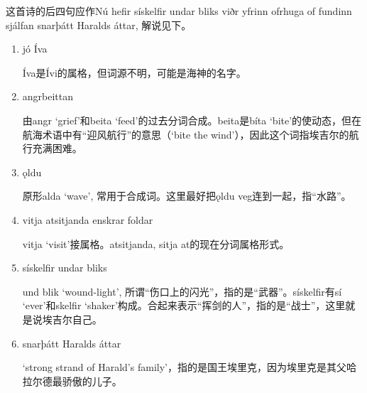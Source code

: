 \begin{grammar*}{}
  这首诗的后四句应作Nú hefir sískelfir undar bliks viðr yfrinn ofrhuga of fundinn sjálfan
  snarþátt Haralds áttar, 解说见下。
  \begin{enumerate}[leftmargin=*]
    \item jó Íva

          Íva是Ívi的属格，但词源不明，可能是海神的名字。

    \item angrbeittan

          由angr `grief'和beita `feed'的过去分词合成。beita是bíta `bite'的使动态，但在航海术语中有“迎风航行”的意思（`bite the wind'），因此这个词指埃吉尔的航行充满困难。

    \item ǫldu

          原形alda `wave', 常用于合成词。这里最好把ǫldu veg连到一起，指“水路”。
    \item vitja atsitjanda enskrar foldar

          vitja `visit'接属格。atsitjanda, sitja at的现在分词属格形式。
    \item sískelfir undar bliks

          und blik `wound-light', 所谓“伤口上的闪光”，指的是“武器”。sískelfir有sí `ever'和skelfir `shaker'构成。合起来表示“挥剑的人”，指的是“战士”，这里就是说埃吉尔自己。

    \item snarþátt Haralds áttar

          `strong strand of Harald's family'，指的是国王埃里克，因为埃里克是其父哈拉尔德最骄傲的儿子。

  \end{enumerate}
\end{grammar*}

